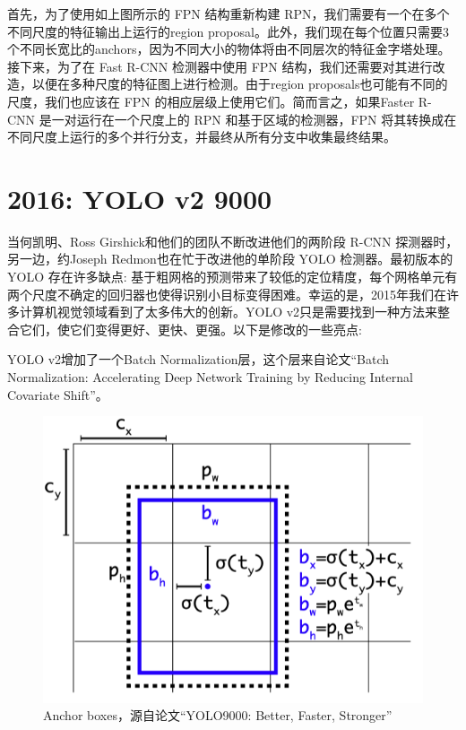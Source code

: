 \documentclass{article}
\begin{document}
	   	首先，为了使用如上图所示的 FPN 结构重新构建 RPN，我们需要有一个在多个不同尺度的特征输出上运行的region proposal。此外，我们现在每个位置只需要3个不同长宽比的anchors，因为不同大小的物体将由不同层次的特征金字塔处理。接下来，为了在 Fast R-CNN 检测器中使用 FPN 结构，我们还需要对其进行改造，以便在多种尺度的特征图上进行检测。由于region proposals也可能有不同的尺度，我们也应该在 FPN 的相应层级上使用它们。简而言之，如果Faster R-CNN 是一对运行在一个尺度上的 RPN 和基于区域的检测器，FPN 将其转换成在不同尺度上运行的多个并行分支，并最终从所有分支中收集最终结果。
	   	
	   	\section{2016: YOLO v2 9000} 
	   	当何凯明、Ross Girshick和他们的团队不断改进他们的两阶段 R-CNN 探测器时，另一边，约Joseph Redmon也在忙于改进他的单阶段 YOLO 检测器。最初版本的 YOLO 存在许多缺点: 基于粗网格的预测带来了较低的定位精度，每个网格单元有两个尺度不确定的回归器也使得识别小目标变得困难。幸运的是，2015年我们在许多计算机视觉领域看到了太多伟大的创新。YOLO v2只是需要找到一种方法来整合它们，使它们变得更好、更快、更强。以下是修改的一些亮点:
	   	
	   	YOLO v2增加了一个Batch Normalization层，这个层来自论文“Batch Normalization: Accelerating Deep Network Training by Reducing Internal Covariate Shift”。
	   	
	   	\begin{figure}[htpb]
	   		\centering
	   		\includegraphics[width=\linewidth]{detectfig/10.png}
	   		\caption{Anchor boxes，源自论文“YOLO9000: Better, Faster, Stronger”}
	   	\end{figure}
	   	
\end{document}
